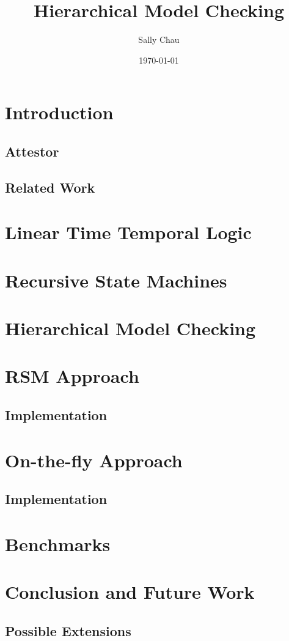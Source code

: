 \documentclass[a4paper,12pt]{report}
\title{Hierarchical Model Checking}
\date{\today}
\author{Sally Chau}
\begin{document}
\maketitle
\tableofcontents


\chapter{Introduction}

\section{Attestor}

\section{Related Work}

\chapter{Linear Time Temporal Logic}

\chapter{Recursive State Machines}

\chapter{Hierarchical Model Checking}

\chapter{RSM Approach}

\section{Implementation}


\chapter{On-the-fly Approach}
\section{Implementation}

\chapter{Benchmarks}

\chapter{Conclusion and Future Work}

\section{Possible Extensions}
\end{document}
